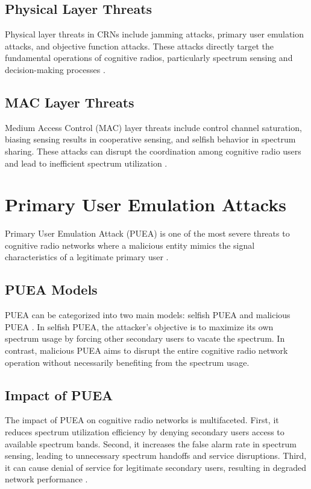 \subsection{Physical Layer Threats}
Physical layer threats in CRNs include jamming attacks, primary user emulation attacks, and objective function attacks. These attacks directly target the fundamental operations of cognitive radios, particularly spectrum sensing and decision-making processes \cite{wang2010security}.

\subsection{MAC Layer Threats}
Medium Access Control (MAC) layer threats include control channel saturation, biasing sensing results in cooperative sensing, and selfish behavior in spectrum sharing. These attacks can disrupt the coordination among cognitive radio users and lead to inefficient spectrum utilization \cite{leon2010security}.

\section{Primary User Emulation Attacks}
Primary User Emulation Attack (PUEA) is one of the most severe threats to cognitive radio networks where a malicious entity mimics the signal characteristics of a legitimate primary user \cite{chen2008defense}.

\subsection{PUEA Models}
PUEA can be categorized into two main models: selfish PUEA and malicious PUEA \cite{chen2008defense}. In selfish PUEA, the attacker's objective is to maximize its own spectrum usage by forcing other secondary users to vacate the spectrum. In contrast, malicious PUEA aims to disrupt the entire cognitive radio network operation without necessarily benefiting from the spectrum usage.

\subsection{Impact of PUEA}
The impact of PUEA on cognitive radio networks is multifaceted. First, it reduces spectrum utilization efficiency by denying secondary users access to available spectrum bands. Second, it increases the false alarm rate in spectrum sensing, leading to unnecessary spectrum handoffs and service disruptions. Third, it can cause denial of service for legitimate secondary users, resulting in degraded network performance \cite{jin2010advanced}.

